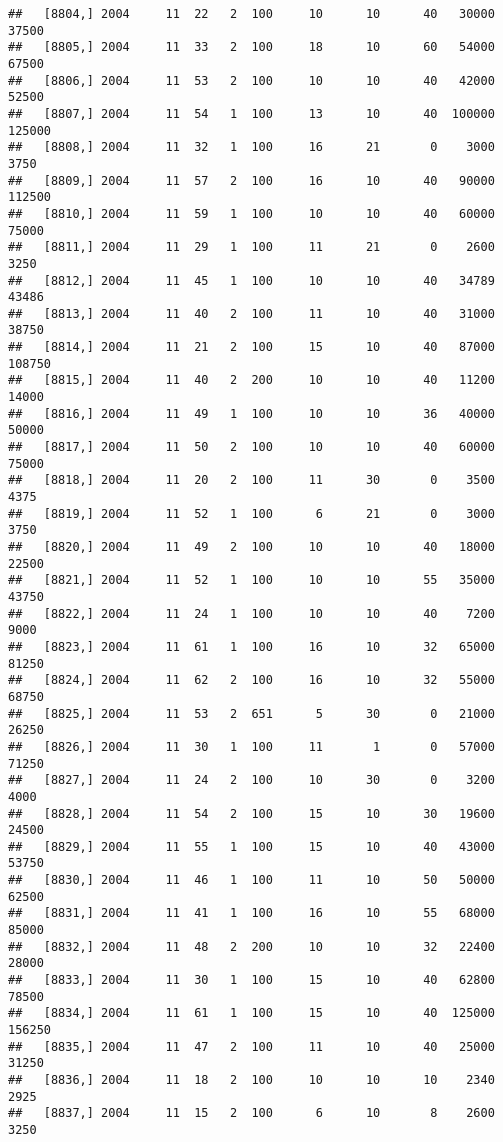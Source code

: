 \documentclass{article}\usepackage[]{graphicx}\usepackage[]{color}
\makeatletter
\newenvironment{kframe}{%
 \def\at@end@of@kframe{}%
 \ifinner\ifhmode%
  \def\at@end@of@kframe{\end{minipage}}%
  \begin{minipage}{\columnwidth}%
 \fi\fi%
 \def\FrameCommand##1{\hskip\@totalleftmargin \hskip-\fboxsep
 \colorbox{shadecolor}{##1}\hskip-\fboxsep
     \hskip-\linewidth \hskip-\@totalleftmargin \hskip\columnwidth}%
 \MakeFramed {\advance\hsize-\width
   \@totalleftmargin\z@ \linewidth\hsize
   \@setminipage}}%
 {\par\unskip\endMakeFramed%
 \at@end@of@kframe}
\newenvironment{knitrout}{}{} %
\makeatother
\begin{document}
\begin{knitrout}
\begin{kframe}
\begin{verbatim}
##   [8804,] 2004     11  22   2  100     10      10      40   30000   37500
##   [8805,] 2004     11  33   2  100     18      10      60   54000   67500
##   [8806,] 2004     11  53   2  100     10      10      40   42000   52500
##   [8807,] 2004     11  54   1  100     13      10      40  100000  125000
##   [8808,] 2004     11  32   1  100     16      21       0    3000    3750
##   [8809,] 2004     11  57   2  100     16      10      40   90000  112500
##   [8810,] 2004     11  59   1  100     10      10      40   60000   75000
##   [8811,] 2004     11  29   1  100     11      21       0    2600    3250
##   [8812,] 2004     11  45   1  100     10      10      40   34789   43486
##   [8813,] 2004     11  40   2  100     11      10      40   31000   38750
##   [8814,] 2004     11  21   2  100     15      10      40   87000  108750
##   [8815,] 2004     11  40   2  200     10      10      40   11200   14000
##   [8816,] 2004     11  49   1  100     10      10      36   40000   50000
##   [8817,] 2004     11  50   2  100     10      10      40   60000   75000
##   [8818,] 2004     11  20   2  100     11      30       0    3500    4375
##   [8819,] 2004     11  52   1  100      6      21       0    3000    3750
##   [8820,] 2004     11  49   2  100     10      10      40   18000   22500
##   [8821,] 2004     11  52   1  100     10      10      55   35000   43750
##   [8822,] 2004     11  24   1  100     10      10      40    7200    9000
##   [8823,] 2004     11  61   1  100     16      10      32   65000   81250
##   [8824,] 2004     11  62   2  100     16      10      32   55000   68750
##   [8825,] 2004     11  53   2  651      5      30       0   21000   26250
##   [8826,] 2004     11  30   1  100     11       1       0   57000   71250
##   [8827,] 2004     11  24   2  100     10      30       0    3200    4000
##   [8828,] 2004     11  54   2  100     15      10      30   19600   24500
##   [8829,] 2004     11  55   1  100     15      10      40   43000   53750
##   [8830,] 2004     11  46   1  100     11      10      50   50000   62500
##   [8831,] 2004     11  41   1  100     16      10      55   68000   85000
##   [8832,] 2004     11  48   2  200     10      10      32   22400   28000
##   [8833,] 2004     11  30   1  100     15      10      40   62800   78500
##   [8834,] 2004     11  61   1  100     15      10      40  125000  156250
##   [8835,] 2004     11  47   2  100     11      10      40   25000   31250
##   [8836,] 2004     11  18   2  100     10      10      10    2340    2925
##   [8837,] 2004     11  15   2  100      6      10       8    2600    3250

\end{verbatim}
\end{kframe}
\end{knitrout}
\end{document}
